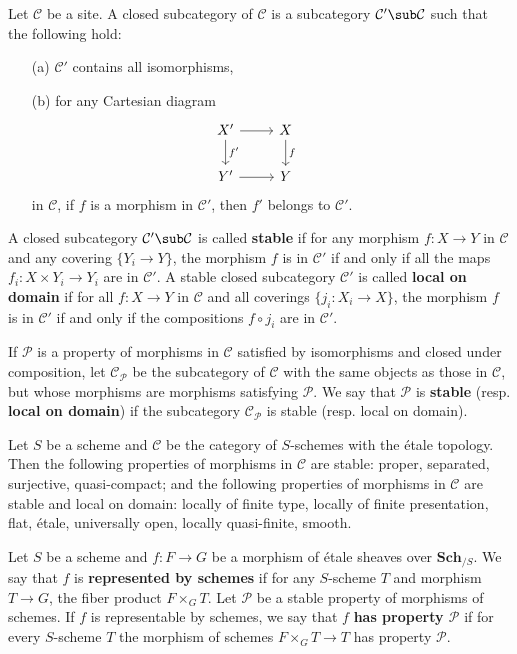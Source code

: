 Let $\mathcal{C}$ be a site. A closed subcategory of $\mathcal{C}$ is a subcategory $\mathcal{C}'\sub\mathcal{C}$ such that the following hold:
\begin{enumerate}
    \item[(a)] $\mathcal{C}'$ contains all isomorphisms,
    \item[(b)] for any Cartesian diagram
    \[\begin{tikzcd}
    X'\ar[r]\ar[d,"f'"]&X\ar[d,"f"]&\\
    Y'\ar[r]&Y
    \end{tikzcd}\]
    in $\mathcal{C}$, if $f$ is a morphism in $\mathcal{C}'$, then $f'$ belongs to $\mathcal{C}'$.
\end{enumerate}
A closed subcategory $\mathcal{C}'\sub\mathcal{C}$ is called \textbf{stable} if for any morphism $f:X\to Y$ in $\mathcal{C}$ and any covering $\{Y_i\to Y\}$, the morphism $f$ is in $\mathcal{C}'$ if and only if all the maps $f_i:X\times Y_i\to Y_i$ are in $\mathcal{C}'$. A stable closed subcategory $\mathcal{C}'$ is called \textbf{local on domain} if for all $f:X\to Y$ in $\mathcal{C}$ and all coverings $\{j_i:X_i\to X\}$, the morphism $f$ is in $\mathcal{C}'$ if and only if the compositions $f\circ j_i$ are in $\mathcal{C}'$.\par
If $\mathcal{P}$ is a property of morphisms in $\mathcal{C}$ satisfied by isomorphisms and closed under composition, let $\mathcal{C}_{\mathcal{P}}$ be the subcategory of $\mathcal{C}$ with the same objects as those in $\mathcal{C}$, but whose morphisms are morphisms satisfying $\mathcal{P}$. We say that $\mathcal{P}$ is \textbf{stable} (resp. \textbf{local on domain}) if the subcategory $\mathcal{C}_\mathcal{P}$ is stable (resp. local on domain).

\begin{example}
Let $S$ be a scheme and $\mathcal{C}$ be the category of $S$-schemes with the \'etale topology. Then the following properties of morphisms in $\mathcal{C}$ are stable: proper, separated, surjective, quasi-compact; and the following properties of morphisms in $\mathcal{C}$ are stable and local on domain: locally of finite type, locally of finite presentation, flat, \'etale, universally open, locally quasi-finite, smooth.
\end{example}

Let $S$ be a scheme and $f:F\to G$ be a morphism of \'etale sheaves over $\mathbf{Sch}_{/S}$. We say that $f$ is \textbf{represented by schemes} if for any $S$-scheme $T$ and morphism $T\to G$, the fiber product $F\times_GT$. Let $\mathcal{P}$ be a stable property of morphisms of schemes. If $f$ is representable by schemes, we say that $f$ \textbf{has property $\mathcal{P}$} if for every $S$-scheme $T$ the morphism of schemes $F\times_GT\to T$ has property $\mathcal{P}$.

